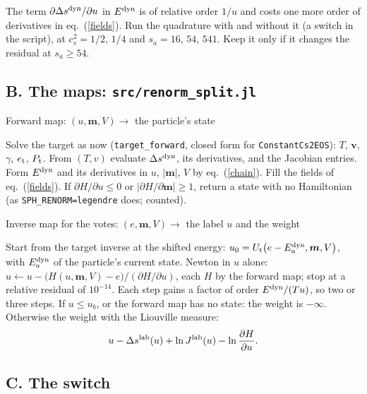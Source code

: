 \documentclass[11pt,aps,preprint,nofootinbib,superscriptaddress,tightenlines]{revtex4-2}
\def\st{\begin{equation}}
\def\stp{\end{equation}}
\def\Eq#1{eq.~(\ref{#1})}
\begin{document}
The term $\partial\Delta s^{\rm dyn}/\partial u$ in $E^{\rm dyn}$ is of relative order $1/u$ and costs one more order of derivatives in \Eq{fields}.  Run the quadrature
with and without it (a switch in the script), at $c_s^2=1/2$, $1/4$ and $s_a=16$, $54$, $541$.  Keep it only if it changes the residual at $s_a\ge54$.

\subsection{B. The maps: \texorpdfstring{\nolinkurl{src/renorm_split.jl}}{src/renorm\_split.jl}}

\begin{algobox}{Forward map: $(u,\bm m,V)\to$ the particle's state}
\begin{algorithmic}[1]
\State Solve the target as now (\texttt{target\_forward}, closed form for \texttt{ConstantCs2EOS}): $T$, $\bm v$, $\gamma$, $e_{\rm t}$, $P_{\rm t}$.
\State From $(T,v)$ evaluate $\Delta s^{\rm dyn}$, its derivatives, and the Jacobian entries.
\State Form $E^{\rm dyn}$ and its derivatives in $u$, $|\bm m|$, $V$ by \Eq{chain}.
\State Fill the fields of \Eq{fields}.
\State If $\partial H/\partial u\le0$ or $|\partial H/\partial\bm m|\ge1$, return a state with no Hamiltonian (as \texttt{SPH\_RENORM=legendre} does; counted).
\end{algorithmic}
\end{algobox}

\begin{algobox}{Inverse map for the votes: $(e,\bm m,V)\to$ the label $u$ and the weight}
\begin{algorithmic}[1]
\State Start from the target inverse at the shifted energy: $u_0=U_{\rm t}\big(e-E^{\rm dyn}_a,\bm m,V\big)$, with $E^{\rm dyn}_a$ of the particle's current state.
\State Newton in $u$ alone: $u\leftarrow u-\big(H(u,\bm m,V)-e\big)\big/(\partial H/\partial u)$, each $H$ by the forward map; stop at a relative residual of
  $10^{-14}$.  Each step gains a factor of order $E^{\rm dyn}/(Tu)$, so two or three steps.
\State If $u\le u_b$, or the forward map has no state: the weight is $-\infty$.
\State Otherwise the weight with the Liouville measure:
  \st
  u-\Delta s^{\rm lab}(u)+\ln J^{\rm lab}(u)-\ln\frac{\partial H}{\partial u} .
  \stp
\end{algorithmic}
\end{algobox}

\subsection{C. The switch}
\end{document}

